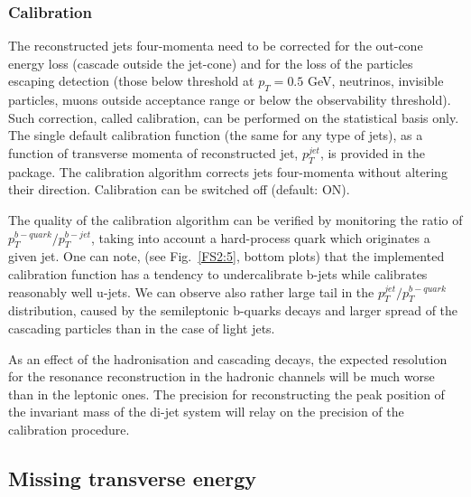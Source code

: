 \boldmath 
\subsubsection{Calibration}
\unboldmath

The reconstructed jets four-momenta need to be 
 corrected for the out-cone energy
loss (cascade outside the jet-cone) and for the loss of the particles
escaping detection (those below threshold at $p_T=0.5$ GeV, neutrinos,
invisible particles, muons outside acceptance range or 
below the observability threshold).
Such correction, called calibration, can be performed on the
statistical basis only.
The single default calibration function (the same for any type of
jets), as a function of transverse momenta 
of reconstructed jet, $p_T^{jet}$,  is provided in the package.
The calibration algorithm corrects jets four-momenta
 without altering their direction.
Calibration can be switched off (default: ON). 

The quality of the calibration algorithm can be verified by monitoring
the ratio of $p_T^{b-quark}/p_T^{b-jet}$, taking into account
a hard-process quark which originates a given jet.
One can note, (see Fig.~\ref{FS2:5}, bottom plots) 
 that the implemented calibration function has a tendency to
undercalibrate b-jets while calibrates reasonably well u-jets. We can
observe also rather large tail in the $p_T^{jet}/p_T^{b-quark}$
distribution, caused by the semileptonic b-quarks decays and larger
spread of the cascading particles than in the  case of light jets.

As an effect of the hadronisation and cascading decays, the expected
resolution for the resonance reconstruction in the hadronic channels
will be much worse than in the leptonic ones.
The precision for reconstructing the peak position of the 
invariant mass  of the di-jet system will relay on the 
precision of the calibration procedure.


\boldmath 
\subsection{Missing transverse energy}
\unboldmath

